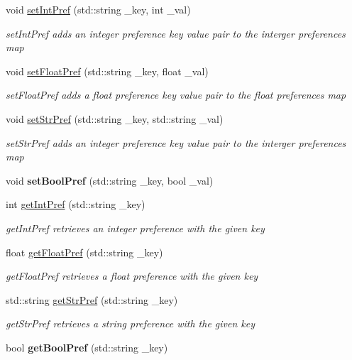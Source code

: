 \begin{DoxyCompactItemize}
void \hyperlink{class_prefs_a6450d0a6f69a631b5ebc405c61d93a33}{set\+Int\+Pref} (std\+::string \+\_\+key, int \+\_\+val)
\begin{DoxyCompactList}\small\item\em set\+Int\+Pref adds an integer preference key value pair to the interger preferences map \end{DoxyCompactList}\item 
void \hyperlink{class_prefs_a8f429735290c3199efde4ee0c34263ce}{set\+Float\+Pref} (std\+::string \+\_\+key, float \+\_\+val)
\begin{DoxyCompactList}\small\item\em set\+Float\+Pref adds a float preference key value pair to the float preferences map \end{DoxyCompactList}\item 
void \hyperlink{class_prefs_a9aabf5ecb5277447229125a673881d0a}{set\+Str\+Pref} (std\+::string \+\_\+key, std\+::string \+\_\+val)
\begin{DoxyCompactList}\small\item\em set\+Str\+Pref adds an integer preference key value pair to the interger preferences map \end{DoxyCompactList}\item 
\hypertarget{class_prefs_aa780a6a550da534c477454ef3df3f1cb}{}void {\bfseries set\+Bool\+Pref} (std\+::string \+\_\+key, bool \+\_\+val)\label{class_prefs_aa780a6a550da534c477454ef3df3f1cb}

\item 
int \hyperlink{class_prefs_adfc47432669292edf36c6972a963200e}{get\+Int\+Pref} (std\+::string \+\_\+key)
\begin{DoxyCompactList}\small\item\em get\+Int\+Pref retrieves an integer preference with the given key \end{DoxyCompactList}\item 
float \hyperlink{class_prefs_ab52937d7b42026f8989c6bb9e14f9f88}{get\+Float\+Pref} (std\+::string \+\_\+key)
\begin{DoxyCompactList}\small\item\em get\+Float\+Pref retrieves a float preference with the given key \end{DoxyCompactList}\item 
std\+::string \hyperlink{class_prefs_ab9ff6556d04e07512bf1fe238c31e3cf}{get\+Str\+Pref} (std\+::string \+\_\+key)
\begin{DoxyCompactList}\small\item\em get\+Str\+Pref retrieves a string preference with the given key \end{DoxyCompactList}\item 
\hypertarget{class_prefs_aab3526aa618b728655196fa88549a2dc}{}bool {\bfseries get\+Bool\+Pref} (std\+::string \+\_\+key)\label{class_prefs_aab3526aa618b728655196fa88549a2dc}


\end{DoxyCompactItemize}
